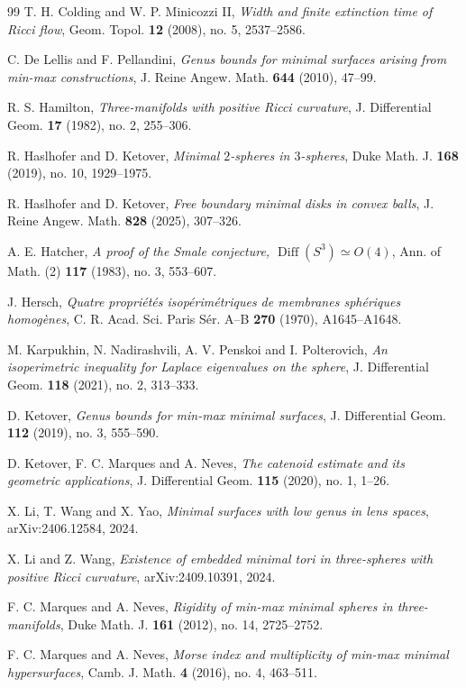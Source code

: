 \documentclass[12pt,english]{amsart}
\theoremstyle{definition}
\begin{document}
\begin{thebibliography}{99}
T. H. Colding and W. P. Minicozzi II,
\emph{Width and finite extinction time of Ricci flow},
Geom. Topol. \textbf{12} (2008), no. 5, 2537--2586.

C. De Lellis and F. Pellandini,
\emph{Genus bounds for minimal surfaces arising from min-max constructions},
J. Reine Angew. Math. \textbf{644} (2010), 47--99.

R. S. Hamilton,
\emph{Three-manifolds with positive Ricci curvature},
J. Differential Geom. \textbf{17} (1982), no. 2, 255--306.

R. Haslhofer and D. Ketover,
\emph{Minimal \(2\)-spheres in \(3\)-spheres},
Duke Math. J. \textbf{168} (2019), no. 10, 1929--1975.

R. Haslhofer and D. Ketover,
\emph{Free boundary minimal disks in convex balls},
J. Reine Angew. Math. \textbf{828} (2025), 307--326.

A. E. Hatcher,
\emph{A proof of the Smale conjecture, \(\operatorname{Diff}(S^3)\simeq O(4)\)},
Ann. of Math. (2) \textbf{117} (1983), no. 3, 553--607.

J. Hersch,
\emph{Quatre propri\'et\'es isop\'erim\'etriques de membranes sph\'eriques homog\`enes},
C. R. Acad. Sci. Paris S\'er. A--B \textbf{270} (1970), A1645--A1648.

M. Karpukhin, N. Nadirashvili, A. V. Penskoi and I. Polterovich,
\emph{An isoperimetric inequality for Laplace eigenvalues on the sphere},
J. Differential Geom. \textbf{118} (2021), no. 2, 313--333.

D. Ketover,
\emph{Genus bounds for min-max minimal surfaces},
J. Differential Geom. \textbf{112} (2019), no. 3, 555--590.

D. Ketover, F. C. Marques and A. Neves,
\emph{The catenoid estimate and its geometric applications},
J. Differential Geom. \textbf{115} (2020), no. 1, 1--26.

X. Li, T. Wang and X. Yao,
\emph{Minimal surfaces with low genus in lens spaces},
arXiv:2406.12584, 2024.

X. Li and Z. Wang,
\emph{Existence of embedded minimal tori in three-spheres with positive Ricci curvature},
arXiv:2409.10391, 2024.

F. C. Marques and A. Neves,
\emph{Rigidity of min-max minimal spheres in three-manifolds},
Duke Math. J. \textbf{161} (2012), no. 14, 2725--2752.

F. C. Marques and A. Neves,
\emph{Morse index and multiplicity of min-max minimal hypersurfaces},
Camb. J. Math. \textbf{4} (2016), no. 4, 463--511.


\end{thebibliography}
\end{document}
